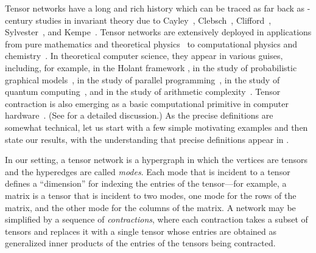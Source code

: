 Tensor networks have a long and rich history which can be traced as
far back as -century studies in invariant theory due
to Cayley~\cite{Cayley1875,Cayley1879}, Clebsch~\cite{Clebsch1861},
Clifford~\cite{Clifford1878}, Sylvester~\cite{Sylvester1878},
and Kempe~\cite{Kempe1885,Kempe1892}.
Tensor networks are extensively deployed in applications from pure mathematics
and theoretical physics~\cite{Kauffman1989,Kuperberg1991,Landsberg2012,LandsbergQY2012,Penrose1956,Penrose1971,RichterGebertL2009,Schrijver2015a} to computational physics and chemistry~\cite{Orus2014,PfeiferHV2014,SolomonikMHSD2014}.
In theoretical computer science,
they appear in various guises,  %
including, for example,
in the Holant framework \cite{Valiant2008,CaiLX2011,CaiGW2016a},
in the study of probabilistic graphical models~\cite{KollerF2009,RobevaS2017},
in the study of parallel programming~\cite{SolomonikH2015},
in the study of quantum computing~\cite{ItaiL2010},
and in the study of arithmetic
complexity~\cite{BeaudryH2007,CapelliDM2016,DammHM2002}.
Tensor contraction is also emerging as a basic
computational primitive in computer
hardware~\cite{JouppiYPPABBBBB17,MarkidisCLPV18}.
(See  for a detailed discussion.)
As the precise definitions are somewhat technical, let us start with
a few simple motivating examples and then state our results,
with the understanding that precise definitions appear
in .

In our setting, a tensor network is a hypergraph in which the vertices are
tensors and the hyperedges are called \emph{modes}.
Each mode that is incident to a tensor defines a ``dimension''
for indexing the entries of the tensor---for example, a matrix is a tensor
that is incident to two modes, one mode for the rows of the matrix, and
the other mode for the columns of the matrix. A network may be simplified
by a sequence of \emph{contractions}, where each contraction takes a subset
of tensors and replaces it with a single tensor whose entries are obtained
as generalized inner products of the entries of the tensors being contracted.

